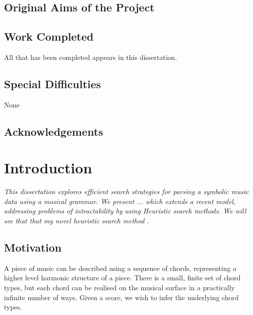 \documentclass[12pt,a4paper,twoside,openright]{report}
\begin{document}


\section*{Original Aims of the Project}



\section*{Work Completed}

All that has been completed appears in this dissertation.

\section*{Special Difficulties}

None

\newpage

\tableofcontents

\listoffigures

\newpage
\section*{Acknowledgements}




\pagestyle{headings}

\chapter{Introduction}
\textit{This dissertation explores efficient search strategies for parsing a symbolic music data using a musical grammar. We present ... which extends a recent model, addressing problems of intractability by using Heuristic search methods. We will see that that my novel heuristic search method . }

\section{Motivation}

A piece of music can be described using a sequence of chords, representing a higher level harmonic structure of a piece. There is a small, finite set of chord types, but each chord can be realised on the musical surface in a practically infinite number of ways. Given a score, we wish to infer the underlying chord types.
\end{document}
